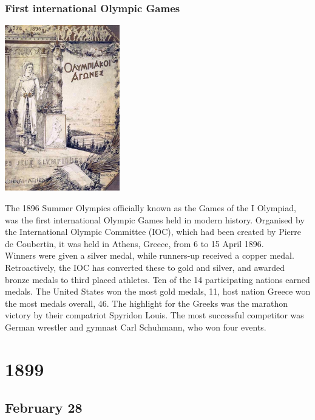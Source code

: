 \documentclass[11pt]{report}
\begin{document}
\subsection{First international Olympic Games}
\vspace{2mm}\begin{center}\includegraphics[width=5cm]{./img/olgames.jpg}\end{center}
The 1896 Summer Olympics officially known as the Games of the I Olympiad, was the first international Olympic Games held in modern history. Organised by the International Olympic Committee (IOC), which had been created by Pierre de Coubertin, it was held in Athens, Greece, from 6 to 15 April 1896.\\
Winners were given a silver medal, while runners-up received a copper medal. Retroactively, the IOC has converted these to gold and silver, and awarded bronze medals to third placed athletes. Ten of the 14 participating nations earned medals. The United States won the most gold medals, 11, host nation Greece won the most medals overall, 46. The highlight for the Greeks was the marathon victory by their compatriot Spyridon Louis. The most successful competitor was German wrestler and gymnast Carl Schuhmann, who won four events.

\chapter{1899}
\section{February 28}
\end{document}
